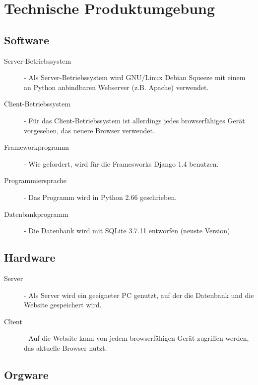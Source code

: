 
\chapter{Technische Produktumgebung}


\section{Software}


\begin{description}
\item [Server-Betriebssystem] - Als Server-Betriebssystem wird GNU/Linux Debian Squeeze mit einem an Python anbindbaren Webserver          (z.B. Apache) verwendet.																		
\item [Client-Betriebssystem] -               Für das Client-Betriebssystem ist allerdings jedes browserfähiges Gerät  vorgesehen, das neuere Browser	 verwendet. 																				
\item [Frameworkprogramm] -               Wie gefordert, wird für die Framesworks Django 1.4  benutzen.						
\item [Programmiersprache] -                 Das Programm  wird in Python 2.66 geschrieben. 									
\item [Datenbankprogramm ] - 	 Die Datenbank wird mit SQLite 3.7.11 entworfen (neuste Version).                                                                                
\end{description}



\section{Hardware}


\begin{description}
\item [Server] - Als Server wird ein geeigneter PC genutzt, auf der die Datenbank und die Website gespeichert wird.
\item [Client] - Auf die Website kann von jedem browserfähigen Gerät zugriffen werden, das aktuelle Browser nutzt. 
\end{description}

\section{Orgware}

